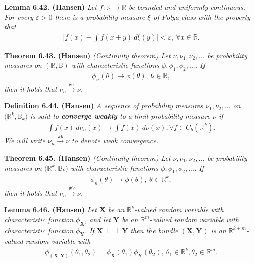\documentclass[a4paper,12pt,openany]{book}
\begin{document}
\textbf{Lemma 6.42. (Hansen)} \emph{Let \(f : \mathbb{R}\to\mathbb{R}\) be bounded and uniformly continuous. For every \(\varepsilon>0\) there is a probability measure \(\xi\) of Polya class with the property that}
\begin{align*}
    \Big\vert f(x)-\int f(x+y)\ d\xi(y)\Big\vert<\varepsilon,\ \forall x\in\mathbb{R}.\tag{6.43}
\end{align*}

\textbf{Theorem 6.43. (Hansen)} \emph{(Continuity theorem) Let \(\nu,\nu_1,\nu_2,...\) be probability measures on \((\mathbb{R},\mathbb{B})\) with characteristic functions \(\phi,\phi_1,\phi_2,...\). If}
\begin{align*}
    \phi_n(\theta)\to \phi(\theta),\ \theta\in\mathbb{R},\tag{6.45}
\end{align*}
\emph{then it holds that \(\nu_n\stackrel{\text{wk}}{\to}\nu\).}

\textbf{Definition 6.44. (Hansen)} \emph{A sequence of probability measures \(\nu_1,\nu_2,...\) on \(\big(\mathbb{R}^k,\mathbb{B}_k\big)\) is said to \textbf{converge weakly} to a limit probability measure \(\nu\) if}
\begin{align*}
    \int f(x)\ d\nu_n(x)\to\int f(x)\ d\nu(x), \forall f\in C_b(\mathbb{R}^k).\tag{6.46}
\end{align*}
\emph{We will write \(\nu_n\stackrel{\text{wk}}{\to}\nu\) to denote weak convergence.}

\textbf{Theorem 6.45. (Hansen)} \emph{(Continuity theorem) Let \(\nu,\nu_1,\nu_2,...\) be probability measures on \(\big(\mathbb{R}^k,\mathbb{B}_k\big)\) with characteristic functions \(\phi,\phi_1,\phi_2,...\). If}
\begin{align*}
    \phi_n(\theta)\to \phi(\theta),\ \theta\in\mathbb{R}^k,\tag{6.47}
\end{align*}
\emph{then it holds that \(\nu_n\stackrel{\text{wk}}{\to}\nu\).}

\textbf{Lemma 6.46. (Hansen)} \emph{Let \(\mathbf{X}\) be an \(\mathbb{R}^k\)-valued random variable with characteristic function \(\phi_\mathbf{X}\), and let \(\mathbf{Y}\) be an \(\mathbb{R}^m\)-valued random variable with characteristic function \(\phi_\mathbf{Y}\). If \(\mathbf{X} \perp \!\!\! \perp \mathbf{Y}\) then the bundle \((\mathbf{X},\mathbf{Y})\) is an \(\mathbb{R}^{k+m}\)-valued random variable with}
\begin{align*}
    \phi_{(\mathbf{X},\mathbf{Y})}(\theta_1,\theta_2)=\phi_\mathbf{X}(\theta_1)\phi_\mathbf{Y}(\theta_2),\ \theta_1\in\mathbb{R}^k,\theta_2\in\mathbb{R}^m.\tag{6.49}
\end{align*}
\end{document}

